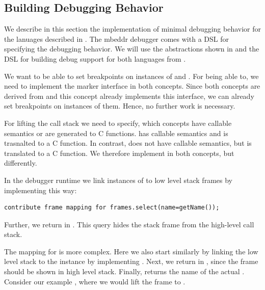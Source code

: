 \subsection{Building Debugging Behavior}

We describe in this section the implementation of minimal debugging behavior for
the lanuages described in . The mbeddr debugger
comes with a \ac{DSL} for specifying the debugging behavior. 
We will use the abstractions shown in  and the \ac{DSL} for
building debug support for both languages from .

  We want to be able to set breakpoints on instances of
 and .
For being able to, we need to implement the marker interface  in
both concepts. Since both concepts
are derived from  and this concept already implements this
interface, we can already set breakpoints on instances of them.
Hence, no further work is necessary.

 For lifting the call stack we need to specify, which
concepts have callable semantics or are generated to C functions. 
 has callable semantics and is trasnalted to a C
function. In contrast,  does not have callable
semantics, but is translated to a C function. We therefore implement 
 in both concepts, but differently.

In the debugger runtime we link instances of  to
low level stack frames by implementing  this way:

\begin{lstlisting}[language=mbeddr]
contribute frame mapping for frames.select(name=getName());
\end{lstlisting}

Further, we return  in . This query
hides the stack frame from the high-level call stack.

The mapping for  is more complex. Here we also start similarly by
linking the low level stack to the  instance by
implementing . Next, we return  in
, since the frame should be shown in high level stack.
Finally,  returns the name of the actual .
Consider our example , where we would lift the frame
 to .


